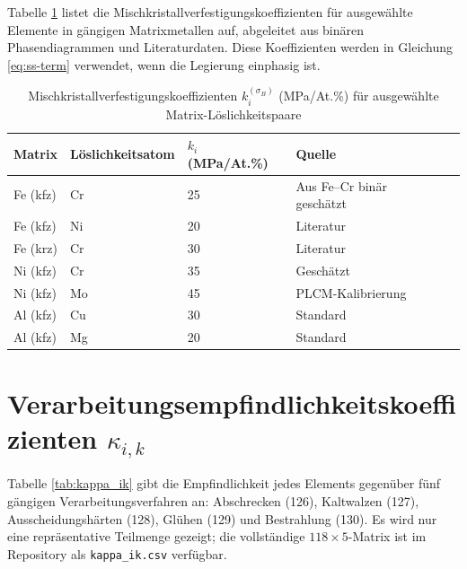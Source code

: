 \documentclass[12pt,a4paper]{article}
\begin{document}
	Tabelle \ref{tab:kss} listet die Mischkristallverfestigungskoeffizienten für ausgewählte Elemente in gängigen Matrixmetallen auf, abgeleitet aus binären Phasendiagrammen und Literaturdaten. Diese Koeffizienten werden in Gleichung \ref{eq:ss-term} verwendet, wenn die Legierung einphasig ist.
	
	\begin{longtable}{p{2cm} p{2cm} p{2cm} p{2cm} p{2cm}}
		\caption{Mischkristallverfestigungskoeffizienten $k_i^{(\sigma_B)}$ (MPa/At.\%) für ausgewählte Matrix-Löslichkeitspaare}\label{tab:kss}\\
		\toprule
		\textbf{Matrix} & \textbf{Löslichkeitsatom} & $k_i$ (MPa/At.\%) & \textbf{Quelle} \\
		\midrule
		Fe (kfz) & Cr & 25 & Aus Fe–Cr binär geschätzt \\
		Fe (kfz) & Ni & 20 & Literatur \\
		Fe (krz) & Cr & 30 & Literatur \\
		Ni (kfz) & Cr & 35 & Geschätzt \\
		Ni (kfz) & Mo & 45 & PLCM-Kalibrierung \\
		Al (kfz) & Cu & 30 & Standard \\
		Al (kfz) & Mg & 20 & Standard \\
		\bottomrule
	\end{longtable}
	
	\section{Verarbeitungsempfindlichkeitskoeffizienten $\kappa_{i,k}$}
	Tabelle \ref{tab:kappa_ik} gibt die Empfindlichkeit jedes Elements gegenüber fünf gängigen Verarbeitungsverfahren an: Abschrecken (126), Kaltwalzen (127), Ausscheidungshärten (128), Glühen (129) und Bestrahlung (130). Es wird nur eine repräsentative Teilmenge gezeigt; die vollständige $118\times5$-Matrix ist im Repository als \texttt{kappa\_ik.csv} verfügbar.
	
\end{document}
